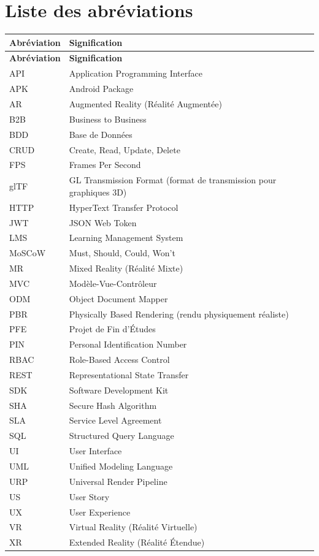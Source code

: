 \chapter*{Liste des abréviations}

\vspace{0.5cm}

\begin{longtable}{p{3cm}p{\dimexpr\textwidth-3cm-4\tabcolsep\relax}}
  \toprule
  \textbf{Abréviation} & \textbf{Signification} \\
  \midrule
  \endfirsthead
  \toprule
  \textbf{Abréviation} & \textbf{Signification} \\
  \midrule
  \endhead
  \bottomrule
  \endfoot
  API    & Application Programming Interface \\
  APK    & Android Package \\
  AR     & Augmented Reality (Réalité Augmentée) \\
  B2B    & Business to Business \\
  BDD    & Base de Données \\
  CRUD   & Create, Read, Update, Delete \\
  FPS    & Frames Per Second \\
  glTF   & GL Transmission Format (format de transmission pour graphiques 3D) \\
  HTTP   & HyperText Transfer Protocol \\
  JWT    & JSON Web Token \\
  LMS    & Learning Management System \\
  MoSCoW & Must, Should, Could, Won't \\
  MR     & Mixed Reality (Réalité Mixte) \\
  MVC    & Modèle-Vue-Contrôleur \\
  ODM    & Object Document Mapper \\
  PBR    & Physically Based Rendering (rendu physiquement réaliste) \\
  PFE    & Projet de Fin d'Études \\
  PIN    & Personal Identification Number \\
  RBAC   & Role-Based Access Control \\
  REST   & Representational State Transfer \\
  SDK    & Software Development Kit \\
  SHA    & Secure Hash Algorithm \\
  SLA    & Service Level Agreement \\
  SQL    & Structured Query Language \\
  UI     & User Interface \\
  UML    & Unified Modeling Language \\
  URP    & Universal Render Pipeline \\
  US     & User Story \\
  UX     & User Experience \\
  VR     & Virtual Reality (Réalité Virtuelle) \\
  XR     & Extended Reality (Réalité Étendue) \\
  
\end{longtable}

\clearpage